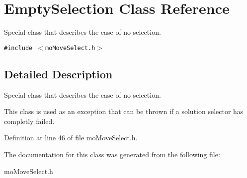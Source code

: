 \section{EmptySelection Class Reference}
\label{class_empty_selection}
Special class that describes the case of no selection.  


{\tt \#include $<$moMoveSelect.h$>$}



\subsection{Detailed Description}
Special class that describes the case of no selection. 

This class is used as an exception that can be thrown if a solution selector has completly failed. 



Definition at line 46 of file moMoveSelect.h.

The documentation for this class was generated from the following file:\begin{CompactItemize}
\item 
moMoveSelect.h\end{CompactItemize}
